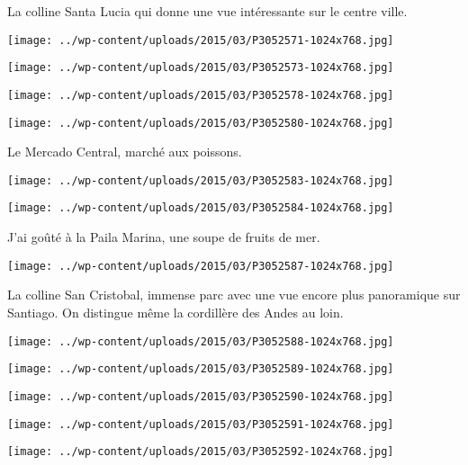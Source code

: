 \pagebreak
La colline Santa Lucia qui donne une vue intéressante sur le centre ville. 
\begin{center} \texttt{[image: ../wp-content/uploads/2015/03/P3052571-1024x768.jpg]} \end{center}
\begin{center} \texttt{[image: ../wp-content/uploads/2015/03/P3052573-1024x768.jpg]} \end{center}
\begin{center} \texttt{[image: ../wp-content/uploads/2015/03/P3052578-1024x768.jpg]} \end{center}
\begin{center} \texttt{[image: ../wp-content/uploads/2015/03/P3052580-1024x768.jpg]} \end{center}

\pagebreak
Le Mercado Central, marché aux poissons. 
\begin{center} \texttt{[image: ../wp-content/uploads/2015/03/P3052583-1024x768.jpg]} \end{center}
\begin{center} \texttt{[image: ../wp-content/uploads/2015/03/P3052584-1024x768.jpg]} \end{center}

\pagebreak
J'ai goûté à la Paila Marina, une soupe de fruits de mer. 
\begin{center} \texttt{[image: ../wp-content/uploads/2015/03/P3052587-1024x768.jpg]} \end{center}

La colline San Cristobal, immense parc avec une vue encore plus panoramique sur Santiago. On distingue même la cordillère des Andes au loin. 
\begin{center} \texttt{[image: ../wp-content/uploads/2015/03/P3052588-1024x768.jpg]} \end{center}
\begin{center} \texttt{[image: ../wp-content/uploads/2015/03/P3052589-1024x768.jpg]} \end{center}
\begin{center} \texttt{[image: ../wp-content/uploads/2015/03/P3052590-1024x768.jpg]} \end{center}
\begin{center} \texttt{[image: ../wp-content/uploads/2015/03/P3052591-1024x768.jpg]} \end{center}
\begin{center} \texttt{[image: ../wp-content/uploads/2015/03/P3052592-1024x768.jpg]} \end{center}

